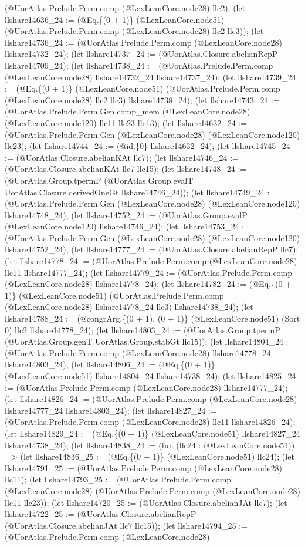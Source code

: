 \documentclass[11pt]{article}
\begin{document}
(@UorAtlas.Prelude.Perm.comp (@LexLeanCore.node28) llc2); (let llshare14636\_24 := (@Eq.\{(0 + 1)\} (@LexLeanCore.node51) (@UorAtlas.Prelude.Perm.comp (@LexLeanCore.node28) llc2 llc3)); (let llshare14736\_24 := (@UorAtlas.Prelude.Perm.comp (@LexLeanCore.node28) llshare14732\_24); (let llshare14737\_24 := (@UorAtlas.Closure.abelianRepP llshare14709\_24); (let llshare14738\_24 := (@UorAtlas.Prelude.Perm.comp (@LexLeanCore.node28) llshare14732\_24 llshare14737\_24); (let llshare14739\_24 := (@Eq.\{(0 + 1)\} (@LexLeanCore.node51) (@UorAtlas.Prelude.Perm.comp (@LexLeanCore.node28) llc2 llc3) llshare14738\_24); (let llshare14743\_24 := (@UorAtlas.Prelude.Perm.Gen.comp\_mem (@LexLeanCore.node28) (@LexLeanCore.node120) llc11 llc23 llc13); (let llshare14632\_24 := (@UorAtlas.Prelude.Perm.Gen (@LexLeanCore.node28) (@LexLeanCore.node120) llc23); (let llshare14744\_24 := (@id.\{0\} llshare14632\_24); (let llshare14745\_24 := (@UorAtlas.Closure.abelianKAt llc7); (let llshare14746\_24 := (@UorAtlas.Closure.abelianKAt llc7 llc15); (let llshare14748\_24 := (@UorAtlas.Group.tpermP (@UorAtlas.Group.evalT UorAtlas.Closure.derivedOneGt llshare14746\_24)); (let llshare14749\_24 := (@UorAtlas.Prelude.Perm.Gen (@LexLeanCore.node28) (@LexLeanCore.node120) llshare14748\_24); (let llshare14752\_24 := (@UorAtlas.Group.evalP (@LexLeanCore.node120) llshare14746\_24); (let llshare14753\_24 := (@UorAtlas.Prelude.Perm.Gen (@LexLeanCore.node28) (@LexLeanCore.node120) llshare14752\_24); (let llshare14777\_24 := (@UorAtlas.Closure.abelianRepP llc7); (let llshare14778\_24 := (@UorAtlas.Prelude.Perm.comp (@LexLeanCore.node28) llc11 llshare14777\_24); (let llshare14779\_24 := (@UorAtlas.Prelude.Perm.comp (@LexLeanCore.node28) llshare14778\_24); (let llshare14782\_24 := (@Eq.\{(0 + 1)\} (@LexLeanCore.node51) (@UorAtlas.Prelude.Perm.comp (@LexLeanCore.node28) llshare14778\_24 llc3) llshare14738\_24); (let llshare14788\_24 := (@congrArg.\{(0 + 1), (0 + 1)\} (@LexLeanCore.node51) (Sort 0) llc2 llshare14778\_24); (let llshare14803\_24 := (@UorAtlas.Group.tpermP (@UorAtlas.Group.genT UorAtlas.Group.stabGt llc15)); (let llshare14804\_24 := (@UorAtlas.Prelude.Perm.comp (@LexLeanCore.node28) llshare14778\_24 llshare14803\_24); (let llshare14806\_24 := (@Eq.\{(0 + 1)\} (@LexLeanCore.node51) llshare14804\_24 llshare14738\_24); (let llshare14825\_24 := (@UorAtlas.Prelude.Perm.comp (@LexLeanCore.node28) llshare14777\_24); (let llshare14826\_24 := (@UorAtlas.Prelude.Perm.comp (@LexLeanCore.node28) llshare14777\_24 llshare14803\_24); (let llshare14827\_24 := (@UorAtlas.Prelude.Perm.comp (@LexLeanCore.node28) llc11 llshare14826\_24); (let llshare14829\_24 := (@Eq.\{(0 + 1)\} (@LexLeanCore.node51) llshare14827\_24 llshare14738\_24); (let llshare14838\_24 := (fun (llc24 : (@LexLeanCore.node51)) => (let llshare14836\_25 := (@Eq.\{(0 + 1)\} (@LexLeanCore.node51) llc24); (let llshare14791\_25 := (@UorAtlas.Prelude.Perm.comp (@LexLeanCore.node28) llc11); (let llshare14793\_25 := (@UorAtlas.Prelude.Perm.comp (@LexLeanCore.node28) (@UorAtlas.Prelude.Perm.comp (@LexLeanCore.node28) llc11 llc23)); (let llshare14720\_25 := (@UorAtlas.Closure.abelianJAt llc7); (let llshare14722\_25 := (@UorAtlas.Closure.abelianRepP (@UorAtlas.Closure.abelianJAt llc7 llc15)); (let llshare14794\_25 := (@UorAtlas.Prelude.Perm.comp (@LexLeanCore.node28) 
\end{document}

